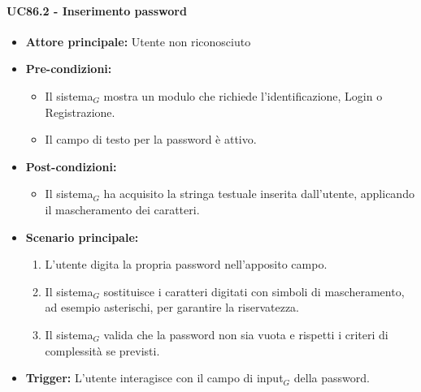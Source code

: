 \documentclass[a4paper, 10pt]{article}
\begin{document}
\paragraph{UC86.2 - Inserimento password}  
\hypertarget{uc:86.2}{}
\begin{itemize}
    \item \textbf{Attore principale:} Utente non riconosciuto
    \item \textbf{Pre-condizioni:} 
        \begin{itemize}
            \item Il sistema$_G$ mostra un modulo che richiede l'identificazione, Login o Registrazione.
            \item Il campo di testo per la password è attivo.
        \end{itemize}
    \item \textbf{Post-condizioni:} 
        \begin{itemize}
            \item Il sistema$_G$ ha acquisito la stringa testuale inserita dall'utente, applicando il mascheramento dei caratteri.
        \end{itemize}
    \item \textbf{Scenario principale:}
        \begin{enumerate}
            \item L'utente digita la propria password nell'apposito campo.
            \item Il sistema$_G$ sostituisce i caratteri digitati con simboli di mascheramento, ad esempio asterischi, per garantire la riservatezza.
            \item Il sistema$_G$ valida che la password non sia vuota e rispetti i criteri di complessità se previsti.
        \end{enumerate}
    \item \textbf{Trigger:} L'utente interagisce con il campo di input$_G$ della password.
\end{itemize}
\end{document}
